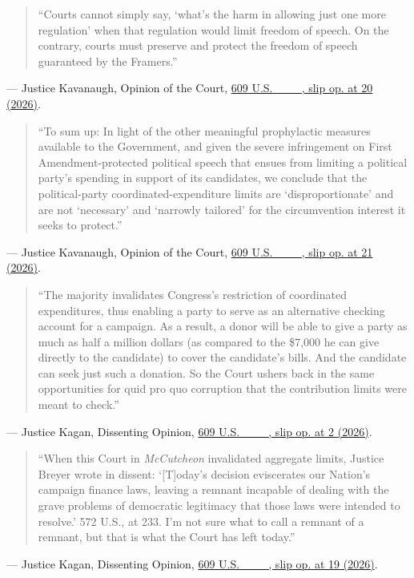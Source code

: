 \documentclass[12pt]{article}
\begin{document}
\begin{quote}
``Courts cannot simply say, `what's the harm in allowing just one more regulation' when that regulation would limit freedom of speech. On the contrary, courts must preserve and protect the freedom of speech guaranteed by the Framers.''
\end{quote}
\noindent --- Justice Kavanaugh, Opinion of the Court, \href{https://www.supremecourt.gov/opinions/25pdf/24-621_h315.pdf}{609 U.S. \_\_\_, slip op. at 20 (2026)}.

\begin{quote}
``To sum up: In light of the other meaningful prophylactic measures available to the Government, and given the severe infringement on First Amendment-protected political speech that ensues from limiting a political party's spending in support of its candidates, we conclude that the political-party coordinated-expenditure limits are `disproportionate' and are not `necessary' and `narrowly tailored' for the circumvention interest it seeks to protect.''
\end{quote}
\noindent --- Justice Kavanaugh, Opinion of the Court, \href{https://www.supremecourt.gov/opinions/25pdf/24-621_h315.pdf}{609 U.S. \_\_\_, slip op. at 21 (2026)}.

\begin{quote}
``The majority invalidates Congress's restriction of coordinated expenditures, thus enabling a party to serve as an alternative checking account for a campaign. As a result, a donor will be able to give a party as much as half a million dollars (as compared to the \$7,000 he can give directly to the candidate) to cover the candidate's bills. And the candidate can seek just such a donation. So the Court ushers back in the same opportunities for quid pro quo corruption that the contribution limits were meant to check.''
\end{quote}
\noindent --- Justice Kagan, Dissenting Opinion, \href{https://www.supremecourt.gov/opinions/25pdf/24-621_h315.pdf}{609 U.S. \_\_\_, slip op. at 2 (2026)}.

\begin{quote}
``When this Court in \textit{McCutcheon} invalidated aggregate limits, Justice Breyer wrote in dissent: `[T]oday's decision eviscerates our Nation's campaign finance laws, leaving a remnant incapable of dealing with the grave problems of democratic legitimacy that those laws were intended to resolve.' 572 U.S., at 233. I'm not sure what to call a remnant of a remnant, but that is what the Court has left today.''
\end{quote}
\noindent --- Justice Kagan, Dissenting Opinion, \href{https://www.supremecourt.gov/opinions/25pdf/24-621_h315.pdf}{609 U.S. \_\_\_, slip op. at 19 (2026)}.
\end{document}
